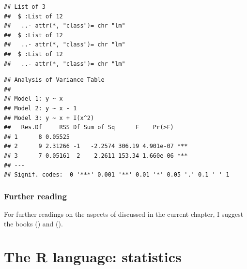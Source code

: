 \documentclass[krantz2]{krantz}\usepackage{knitr}
\begin{document}
\begin{knitrout}\footnotesize
{}\color{fgcolor}\begin{kframe}
\begin{alltt}
 \hlkwb{<-} \hlstd{()}
 \hlkwb{<-}  \hlopt{~}  \hlopt{~}  \hlopt{-}  \hlopt{~}  \hlopt{+} \hlopt{^}\hlstd{))}
   \hlstd{(} 
    \hlkwb{<-}   
   \hlstd{\}}
  \hlstd{=} \hlstd{)}
\end{alltt}
\begin{verbatim}
## List of 3
##  $ :List of 12
##   ..- attr(*, "class")= chr "lm"
##  $ :List of 12
##   ..- attr(*, "class")= chr "lm"
##  $ :List of 12
##   ..- attr(*, "class")= chr "lm"
\end{verbatim}
\begin{alltt}
\end{alltt}
\begin{verbatim}
## Analysis of Variance Table
## 
## Model 1: y ~ x
## Model 2: y ~ x - 1
## Model 3: y ~ x + I(x^2)
##   Res.Df     RSS Df Sum of Sq      F    Pr(>F)    
## 1      8 0.05525                                  
## 2      9 2.31266 -1   -2.2574 306.19 4.901e-07 ***
## 3      7 0.05161  2    2.2611 153.34 1.660e-06 ***
## ---
## Signif. codes:  0 '***' 0.001 '**' 0.01 '*' 0.05 '.' 0.1 ' ' 1
\end{verbatim}
\end{kframe}
\end{knitrout}

\subsection{Further reading}
For further readings on the aspects of \Rlang discussed in the current chapter, I suggest the books  (\citeauthor{Matloff2011}) and  (\citeauthor{Wickham2019}).




\chapter{The R language: statistics}\label{chap:R:statistics}
\end{document}
